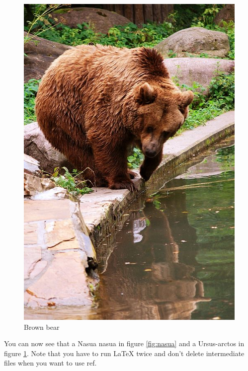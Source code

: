 \documentclass[a4paper]{scrreprt}
\begin{document}
\begin{figure}[ht]
\begin{minipage}[b]{0.45\linewidth}
        \includegraphics[width=\textwidth]{Ursus-arctos.jpg}
        \caption{Brown bear}
        \label{fig:Ursus-arctos}
    \end{minipage}
\end{figure}

You can now see that a Nasua nasua in figure \ref{fig:nasua} and a Ursus-arctos
in figure \ref{fig:Ursus-arctos}. Note that you have to run LaTeX twice and
don't delete intermediate files when you want to use ref.
\end{document}
